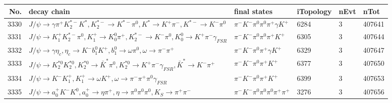 \begin{table}[htbp] 
\begin{center}
\begin{small}
\begin{tabular}{rlllll}\hline\hline
 No. & decay chain & final states &  iTopology & nEvt & nTot \\\hline
3330&$J/\psi       \rightarrow \gamma       \pi^{+}        K_2^{*-}       K^{*}          , K_2^{*-}        \rightarrow K^{*-}         \pi^{0}        , K^{*}           \rightarrow K^{+}          \pi^{-}        , K^{*-}          \rightarrow K^{-}          \pi^{0}        $&$\pi^{-}        K^{-}          \pi^{0}        \pi^{0}        \pi^{+}        \gamma       K^{+}          $& 6284&    3&407641\\
3331&$J/\psi       \rightarrow K_1^{+}        K_2^{*-}       \pi^{0}        , K_1^{+}         \rightarrow K_0^{0}        \pi^{+}        , K_2^{*-}        \rightarrow K^{-}          \pi^{0}        , K_0^{0}         \rightarrow K^{+}          \pi^{-}        \gamma_{FSR} $&$\pi^{-}        K^{-}          \pi^{0}        \pi^{0}        \pi^{+}        K^{+}          $& 6305&    3&407644\\
3332&$J/\psi       \rightarrow \gamma       \eta_{c}    , \eta_{c}     \rightarrow K^{-}          b_{1}^{0}      K^{+}          , b_{1}^{0}       \rightarrow \omega         \pi^{0}        , \omega          \rightarrow \pi^{-}        \pi^{+}        $&$\pi^{-}        K^{-}          \pi^{0}        \pi^{+}        \gamma       K^{+}          $& 6329&    3&407647\\
3333&$J/\psi       \rightarrow K_2^{*0}       K_2^{*0}       , K_2^{*0}        \rightarrow \bar{K}^{*}   \pi^{0}        , K_2^{*0}        \rightarrow K^{+}          \pi^{-}        \gamma_{FSR} , \bar{K}^{*}    \rightarrow K^{-}          \pi^{+}        $&$\pi^{-}        K^{-}          \pi^{0}        \pi^{+}        K^{+}          $& 6377&    3&407650\\
3334&$J/\psi       \rightarrow K^{-}          K_1^{+}        , K_1^{+}         \rightarrow \omega         K^{+}          , \omega          \rightarrow \pi^{-}        \pi^{+}        \pi^{0}        \gamma_{FSR} $&$\pi^{-}        K^{-}          \pi^{0}        \pi^{+}        K^{+}          $& 6399&    3&407653\\
3335&$J/\psi       \rightarrow a_{0}^{+}      K^{-}          K^{0}          , a_{0}^{+}       \rightarrow \eta          \pi^{+}        , \eta           \rightarrow \pi^{0}        \pi^{0}        \pi^{0}        , K_{S}           \rightarrow \pi^{+}        \pi^{-}        $&$\pi^{-}        K^{-}          \pi^{0}        \pi^{0}        \pi^{0}        \pi^{+}        \pi^{+}        $& 3276&    3&407656\\

\end{tabular}
\end{small}
\end{center}
\end{table}
